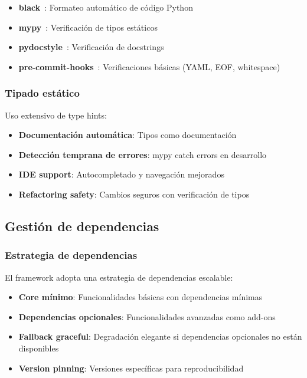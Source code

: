 \begin{itemize}
\begin{itemize}
    \item \textbf{black}~\cite{black}: Formateo automático de código Python
    \item \textbf{mypy}~\cite{mypy}: Verificación de tipos estáticos
    \item \textbf{pydocstyle}~\cite{pydocstyle}: Verificación de docstrings
    \item \textbf{pre-commit-hooks}~\cite{pre_commit_hooks}: Verificaciones básicas (YAML, EOF, whitespace)
\end{itemize}

\subsubsection{Tipado estático}
Uso extensivo de type hints:

\begin{itemize}
    \item \textbf{Documentación automática}: Tipos como documentación
    \item \textbf{Detección temprana de errores}: mypy catch errors en desarrollo
    \item \textbf{IDE support}: Autocompletado y navegación mejorados
    \item \textbf{Refactoring safety}: Cambios seguros con verificación de tipos
\end{itemize}

\subsection{Gestión de dependencias}
\label{subsec:gestion_dependencias}

\subsubsection{Estrategia de dependencias}
El framework adopta una estrategia de dependencias escalable:

\begin{itemize}
    \item \textbf{Core mínimo}: Funcionalidades básicas con dependencias mínimas
    \item \textbf{Dependencias opcionales}: Funcionalidades avanzadas como add-ons
    \item \textbf{Fallback graceful}: Degradación elegante si dependencias opcionales no están disponibles
    \item \textbf{Version pinning}: Versiones específicas para reproducibilidad
\end{itemize}


\end{itemize}
